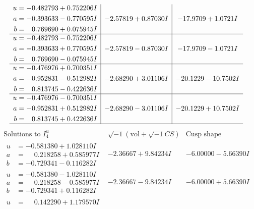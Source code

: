 \documentclass[1p]{elsarticle_modified}
\theoremstyle{definition}
\newcommand{\I}{\sqrt{-1}}
\begin{document}
$$\begin{array}{c|c|c}
\begin{aligned}
u &= -0.482793 + 0.752206 I \\
a &= -0.393633 - 0.770595 I \\
b &= \phantom{-}0.769690 + 0.075945 I\end{aligned}
 & -2.57819 + 0.87030 I & -17.9709 + 1.0721 I \\ \hline\begin{aligned}
u &= -0.482793 - 0.752206 I \\
a &= -0.393633 + 0.770595 I \\
b &= \phantom{-}0.769690 - 0.075945 I\end{aligned}
 & -2.57819 - 0.87030 I & -17.9709 - 1.0721 I \\ \hline\begin{aligned}
u &= -0.476976 + 0.700351 I \\
a &= -0.952831 - 0.512982 I \\
b &= \phantom{-}0.813745 - 0.422636 I\end{aligned}
 & -2.68290 + 3.01106 I & -20.1229 - 10.7502 I \\ \hline\begin{aligned}
u &= -0.476976 - 0.700351 I \\
a &= -0.952831 + 0.512982 I \\
b &= \phantom{-}0.813745 + 0.422636 I\end{aligned}
 & -2.68290 - 3.01106 I & -20.1229 + 10.7502 I\\
 \hline 
 \end{array}$$\newpage$$\begin{array}{c|c|c}  
\text{Solutions to }I^u_{4}& \I (\text{vol} + \sqrt{-1}CS) & \text{Cusp shape}\\
 \hline 
\begin{aligned}
u &= -0.581380 + 1.028110 I \\
a &= \phantom{-}0.218258 + 0.585977 I \\
b &= -0.729341 - 0.116282 I\end{aligned}
 & -2.36667 + 9.84234 I & -6.00000 - 5.66390 I \\ \hline\begin{aligned}
u &= -0.581380 - 1.028110 I \\
a &= \phantom{-}0.218258 - 0.585977 I \\
b &= -0.729341 + 0.116282 I\end{aligned}
 & -2.36667 - 9.84234 I & -6.00000 + 5.66390 I \\ \hline\begin{aligned}
u &= \phantom{-}0.142290 + 1.179570 I \\

\end{aligned}
\end{array}$$
\end{document}
